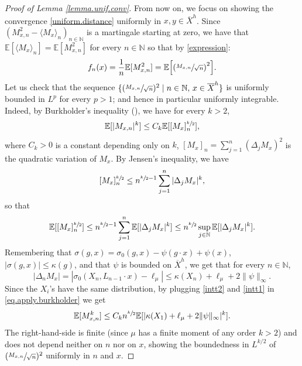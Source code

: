 \documentclass[10pt]{amsart}
\let\sep\mid
\theoremstyle{plain}
\theoremstyle{definition}
\newcommand\E{\mathbb{E}}
\newcommand\N{\mathbb{N}}
\begin{document}
\begin{proof}[Proof of Lemma \ref{lemma.unif.conv}]
From now on, we focus on showing the convergence \eqref{uniform.distance} uniformly in $x,y\in \overline{X}^h$. Since $(M_{x,n}^2-\langle M_x\rangle_n)_{n\in \N}$ is a martingale starting at zero, we have that $\E[\langle M_x\rangle_n]=\E[M_{x,n}^2]$ for every $n\in \N$ so that by \eqref{expression}:
\begin{equation}\label{identity1}
f_n(x)=\frac{1}{n}\E[M_{x,n}^2]=\E\Bigl[\left(\sfrac{M_{x,n}}{\sqrt{n}}\right)^2\Bigr].
\end{equation}
Let us check that the sequence $\{(\sfrac{M_{x,n}}{\sqrt{n}})^2 \sep n\in \N,\, x\in \overline{X}^h\}$ is uniformly bounded in $L^p$ for every $p> 1$; and hence in particular uniformly integrable. Indeed,
by Burkholder's inequality (\cite[Th.\,9]{burkholder}), we have
for every $k>2$,
\begin{equation}\label{eq.apply.burkholder}
\E[|M_{x,n}|^k]\leq C_k \E[[M_x]_n^{\sfrac{k}{2}}],
\end{equation}
where $C_k>0$ is a constant depending only on $k$, $[M_x]_n=\sum_{j=1}^n{(\Delta_j M_{x})^2}$ is the quadratic variation of $M_x$.
By Jensen's inequality, we have
\[
[M_x]_n^{\sfrac{k}{2}}\leq n^{\sfrac{k}{2}-1}\sum_{j=1}^n{|\Delta_j M_{x}|^k},
\]
so that
\begin{equation}\label{intt1}
\E[[M_x]_n^{\sfrac{k}{2}}]\leq
n^{\sfrac{k}{2}-1}\sum_{j=1}^n{\E[|\Delta_j M_{x}|^k]}\leq n^{\sfrac{k}{2}}
\sup_{j\in \N}{\E[|\Delta_j M_{x}|^k}].
\end{equation}
Remembering that $\sigma(g,x)=\sigma_0(g,x)-\psi(g\cdot x)+\psi(x)$, $|\sigma(g,x)|\leq \kappa(g)$, and that $\psi$ is bounded on $\overline{X}^h$, we get that for every $n\in \N$,
\begin{equation}\label{intt2}
|\Delta_n M_{x}|=|\sigma_0(X_n, L_{n-1}\cdot x)-\ell_{\mu}|\leq \kappa(X_n) + \ell_{\mu} +2\|\psi\|_{\infty}.
\end{equation}
Since the $X_i$'s have the same distribution, by plugging \eqref{intt2} and
\eqref{intt1} in \eqref{eq.apply.burkholder} we get
\[
\E[M_{x,n}^k]\leq C_k n^{\sfrac{k}{2}}\E[|\kappa(X_1) + \ell_{\mu} +2\|\psi\|_{\infty}|^k].
\]
The right-hand-side is finite (since $\mu$ has a finite moment of any order $k>2$) and does not depend neither on $n$ nor on $x$, showing the boundedness in $L^{k/2}$ of $(\sfrac{M_{x,n}}{\sqrt{n}})^2$ uniformly in $n$ and $x$.


\end{proof}
\end{document}
